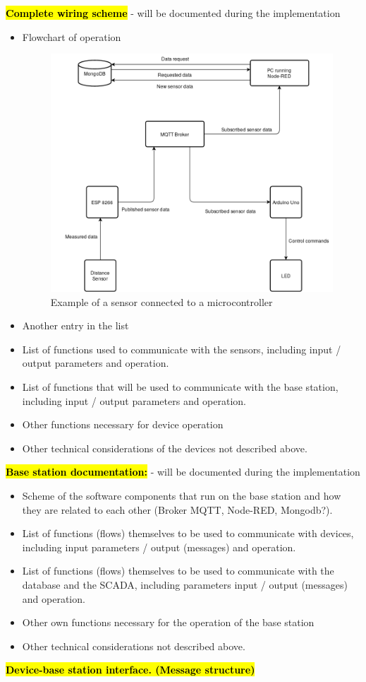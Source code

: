 \documentclass{article}
\begin{document}
\textcolor{red}{\textbf{\hl{Complete wiring scheme }}} - will be documented during the implementation 
\begin{itemize}
	 \item Flowchart of operation  
	\begin{figure}[h]
		\center
		\includegraphics[scale=1]{flow.png}
		\caption{Example of a sensor connected to a microcontroller}
		\label{sensorWithArduino}
	\end{figure}
	\item Another entry in the list
	\item List of functions used to communicate with the sensors, including input / output parameters and operation.
	\item List of functions that will be used to communicate with the base station, including input / output parameters and operation. 
	\item Other functions necessary for device operation
	\item Other technical considerations of the devices not described above. 
\end{itemize}
	
\textcolor{red}{\textbf{\hl{Base station documentation:}}} - will be documented during the implementation
\begin{itemize}
	\item Scheme of the software components that run on the base station and how they are related to each other (Broker MQTT, Node-RED, Mongodb?). 
	\item List of functions (flows) themselves to be used to communicate with devices, including input parameters / output (messages) and operation.
	\item List of functions (flows) themselves to be used to communicate with the database and the SCADA, including parameters input / output (messages) and operation. 
	\item Other own functions necessary for the operation of the base station
	\item Other technical considerations not described above. 
\end{itemize}
\textcolor{red}{\textbf{\hl{Device-base station interface. (Message structure)}}}
\end{document}
